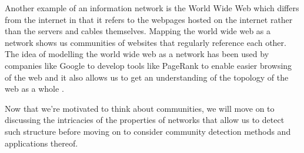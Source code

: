 Another example of an information network is the World Wide Web which differs from the internet in that it refers to the webpages hosted on the internet rather than the servers and cables themselves. Mapping the world wide web as a network shows us communities of websites that regularly reference each other. The idea of modelling the world wide web as a network has been used by companies like Google to develop tools like PageRank to enable easier browsing of the web \cite{pagerank} and it also allows us to get an understanding of the topology of the web as a whole \cite{BARABASI200069}.

Now that we're motivated to think about communities, we will move on to discussing the intricacies of the properties of networks that allow us to detect such structure before moving on to consider community detection methods and applications thereof.
